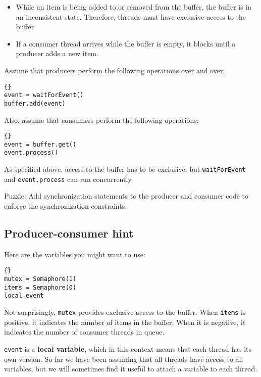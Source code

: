 \documentclass{book}
\newcommand{\clearemptydoublepage}{\newpage\cleardoublepage}
\begin{document}
\begin{itemize}

\item While an item is being added to or removed from the buffer,
the buffer is in an inconsistent state.  Therefore, threads must
have exclusive access to the buffer.

\item If a consumer thread arrives while the buffer is empty, it
blocks until a producer adds a new item.

\end{itemize}

Assume that producers perform the following operations over and
over:

\begin{lstlisting}[title={Basic producer code}]{}
event = waitForEvent()
buffer.add(event)
\end{lstlisting}

Also, assume that consumers perform the following operations:

\begin{lstlisting}[title={Basic consumer code}]{}
event = buffer.get()
event.process()
\end{lstlisting}

As specified above, access to the buffer has to be exclusive,
but {\tt waitForEvent} and {\tt event.process}
can run concurrently.

Puzzle: Add synchronization statements to the producer and
consumer code to enforce the synchronization constraints.

\clearemptydoublepage
\subsection{Producer-consumer hint}

Here are the variables you might want to use:

\begin{lstlisting}[title={Producer-consumer initialization}]{}
mutex = Semaphore(1)
items = Semaphore(0)
local event
\end{lstlisting}

Not surprisingly, {\tt mutex} provides exclusive access to
the buffer.  When {\tt items} is positive, it indicates the
number of items in the buffer.  When it is negative, it
indicates the number of consumer threads in queue.

{\tt event} is a {\bf local variable}, which in this context means
that each thread has its own version.
So far we have been assuming that all threads have access
to all variables, but we will sometimes find it useful to
attach a variable to each thread.
\end{document}
